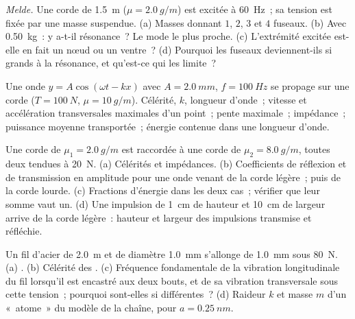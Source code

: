 \begin{exercise}[$\star\star$]\label{exo:b2:waves-on-strings:6}
\emph{Melde.} Une corde de \qty{1.5}{m} ($\mu = \qty{2.0}{g/m}$) est excitée à
\qty{60}{Hz}~; sa tension est fixée par une masse suspendue. (a) Masses donnant
$1$, $2$, $3$ et $4$ fuseaux. (b) Avec \qty{0.50}{kg}~: y a-t-il résonance~?
Le mode le plus proche. (c) L'extrémité excitée est-elle en fait un nœud ou un ventre~?
(d) Pourquoi les fuseaux deviennent-ils si grands à la résonance, et qu'est-ce qui les limite~?
\end{exercise}

\begin{exercise}[$\star\star$]\label{exo:b2:waves-on-strings:7}
Une onde $y = A\cos(\omega t - kx)$ avec $A = \qty{2.0}{mm}$, $f = \qty{100}{Hz}$
se propage sur une corde ($T = \qty{100}{N}$, $\mu = \qty{10}{g/m}$). Célérité, $k$,
longueur d'onde~; vitesse et accélération transversales maximales d'un point~;
pente maximale~; impédance~; puissance moyenne transportée~; énergie contenue dans une
longueur d'onde.
\end{exercise}

\begin{exercise}[$\star\star$]\label{exo:b2:waves-on-strings:8}
Une corde de $\mu_1 = \qty{2.0}{g/m}$ est raccordée à une corde de $\mu_2 = \qty{8.0}{g/m}$,
toutes deux tendues à \qty{20}{N}. (a) Célérités et impédances. (b) Coefficients de
réflexion et de transmission en amplitude pour une onde venant de la
corde légère~; puis de la corde lourde. (c) Fractions d'énergie dans les deux
cas~; vérifier que leur somme vaut un. (d) Une impulsion de \qty{1}{cm} de hauteur et \qty{10}{cm} de largeur
arrive de la corde légère~: hauteur et largeur des impulsions transmise et
réfléchie.
\end{exercise}

\begin{exercise}[$\star\star$]\label{exo:b2:waves-on-strings:9}
Un fil d'acier de \qty{2.0}{m} et de diamètre \qty{1.0}{mm} s'allonge de \qty{1.0}{mm}
sous \qty{80}{N}. (a) . (b) Célérité des .
(c) Fréquence fondamentale de la vibration longitudinale du fil lorsqu'il
est encastré aux deux bouts, et de sa vibration transversale sous cette
tension~; pourquoi sont-elles si différentes~? (d) Raideur $k$ et masse $m$ d'un
«~atome~» du modèle de la chaîne, pour $a = \qty{0.25}{nm}$.
\end{exercise}

